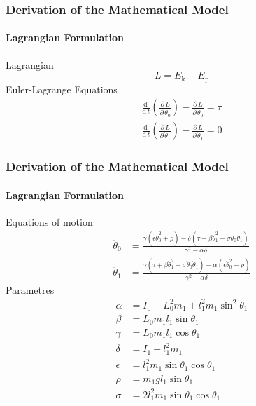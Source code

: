 \documentclass[]{beamer}
\newcommand{\dif}[2]{\ensuremath{\frac{\mathrm{d}\, #1}{\mathrm{d}\, #2}}}
\newcommand{\diff}[2]{\ensuremath{\frac{\partial\, #1}{\partial\, #2}}}
\newcommand{\lrp}[1]{\ensuremath{\left( #1 \right)}}
\newcommand{\ui}[2]{#1 _{\text{#2}}}
\begin{document}
\begin{frame}
	\frametitle{Derivation of the Mathematical Model}
	\framesubtitle{Lagrangian Formulation}
Lagrangian
\begin{equation*}
L = \ui{E}{k} - \ui{E}{p}
\end{equation*}
Euler-Lagrange Equations
\begin{subequations}
	\begin{align*}
	\dif{}{t}\lrp{\diff{L}{\dot{\theta}_0}}-\diff{L}{\dot{\theta}_0} = \tau\\
	\dif{}{t}\lrp{\diff{L}{\dot{\theta}_1}}-\diff{L}{\dot{\theta}_1} = 0
	\end{align*}
\end{subequations}
\end{frame}
\begin{frame}
	\frametitle{Derivation of the Mathematical Model}
	\framesubtitle{Lagrangian Formulation}
	Equations of motion
	\begin{subequations}
		\begin{align*}
		\ddot{\theta}_0 &= \frac{\gamma(\epsilon\dot{\theta}_0^2+\rho)-\delta(\tau+\beta\dot{\theta}_1^2-\sigma\dot{\theta}_0\dot{\theta}_1)}{\gamma^2-\alpha\delta}\\
		\ddot{\theta}_1 &= \frac{\gamma(\tau+\beta\dot{\theta}_1^2-\sigma\dot{\theta}_0\dot{\theta}_1)-\alpha(\epsilon\dot{\theta}_0^2+\rho)}{\gamma^2-\alpha\delta}
		\end{align*}
	\end{subequations}
Parametres
\begin{subequations}
	\begin{align*}
	\alpha &= I_0+L_0^2m_1+l_1^2m_1\sin^2\theta_1\\
	\beta &= L_0m_1l_1\sin\theta_1 \\
	\gamma &= L_0m_1l_1\cos\theta_1\\
	\delta &= I_1+l_1^2m_1\\
	\epsilon &= l^2_1m_1\sin\theta_1\cos\theta_1\\
	\rho &= m_1gl_1\sin\theta_1\\
	\sigma &= 2l^2_1m_1\sin\theta_1\cos\theta_1
	\end{align*}
\end{subequations}
\end{frame}
\end{document}

